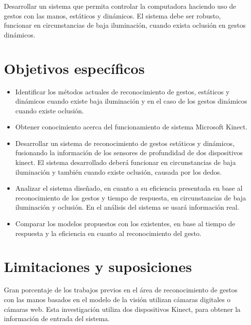 Desarrollar un sistema que permita controlar la computadora haciendo uso de gestos con las manos, estáticos y dinámicos. El sistema debe ser robusto, funcionar en circunstancias de baja iluminación, cuando exista oclusión en gestos dinámicos.



\section{Objetivos espec\'ificos}\label{sec:objetivosEspecificos}

\begin{itemize}
	\item Identificar los m\'etodos actuales de reconocimiento de gestos, estáticos y din\'amicos cuando existe baja iluminación  y en el caso de los gestos dinámicos cuando existe oclusión. 
	
	\item  Obtener conocimiento acerca del funcionamiento de sistema Microsoft Kinect.
	
	\item Desarrollar un sistema de reconocimiento de gestos estáticos y dinámicos, fusionando la información de los sensores de  profundidad de dos dispositivos kinect. El sistema desarrollado deberá funcionar en circunstancias de baja iluminación y también cuando existe oclusión, causada por los dedos. 
	
	\item Analizar el sistema dise\~nado, en cuanto a su eficiencia presentada en base al reconocimiento de los gestos y tiempo de respuesta, en circunstancias de baja iluminación y oclusión. En el análisis del sistema se usar\'a información real.  
	
	\item Comparar los modelos propuestos  con los existentes, en base al tiempo de respuesta y la eficiencia en cuanto al reconocimiento del gesto. 
\end{itemize}



\section{Limitaciones y suposiciones}\label{sec:Limitaciones&Suposiciones}

Gran porcentaje de los trabajos previos en el \'area de reconocimiento de gestos con las manos basados en el modelo de la visión  utilizan c\'amaras digitales o c\'amaras web. Esta investigación utiliza dos dispositivos Kinect, para obtener la información de entrada del sistema.

